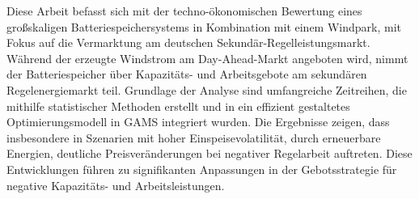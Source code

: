 Diese Arbeit befasst sich mit der techno-ökonomischen Bewertung eines großskaligen Batteriespeichersystems
in Kombination mit einem Windpark, mit Fokus auf die Vermarktung am deutschen Sekundär-Regelleistungsmarkt.
Während der erzeugte Windstrom am Day-Ahead-Markt angeboten wird, nimmt der Batteriespeicher über Kapazitäts-
und Arbeitsgebote am sekundären Regelenergiemarkt teil. Grundlage der Analyse sind umfangreiche Zeitreihen, die mithilfe
statistischer Methoden erstellt und in ein effizient gestaltetes Optimierungsmodell in GAMS integriert wurden.
Die Ergebnisse zeigen, dass insbesondere in Szenarien mit hoher Einspeisevolatilität, durch erneuerbare Energien,
deutliche Preisveränderungen bei negativer Regelarbeit auftreten.
Diese Entwicklungen führen zu signifikanten Anpassungen in der Gebotsstrategie für negative Kapazitäts- und Arbeitsleistungen.